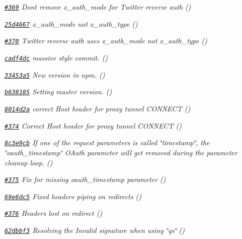 \begin{DoxyItemize}
\item {\itshape \href{https://github.com/mikeal/request/pull/369}{\tt \#369} Don\textquotesingle{}t remove x\+\_\+auth\+\_\+mode for Twitter reverse auth ()}
\item {\itshape \href{https://github.com/mikeal/request/commit/25d466773c43949e2eea4236ffc62841757fd1f0}{\tt 25d4667} x\+\_\+auth\+\_\+mode not x\+\_\+auth\+\_\+type ()}
\item {\itshape \href{https://github.com/mikeal/request/pull/370}{\tt \#370} Twitter reverse auth uses x\+\_\+auth\+\_\+mode not x\+\_\+auth\+\_\+type ()}
\item {\itshape \href{https://github.com/mikeal/request/commit/cadf4dc54f4ee3fae821f6beb1ea6443e528bf6f}{\tt cadf4dc} massive style commit. ()}
\item {\itshape \href{https://github.com/mikeal/request/commit/33453a53bc37e4499853b9d929b3603cdf7a31cd}{\tt 33453a5} New version in npm. ()}
\item {\itshape \href{https://github.com/mikeal/request/commit/b6381854006470af1d0607f636992c7247b6720f}{\tt b638185} Setting master version. ()}
\item {\itshape \href{https://github.com/mikeal/request/commit/8014d2a5b797f07cf56d2f39a346031436e1b064}{\tt 8014d2a} correct Host header for proxy tunnel C\+O\+N\+N\+E\+C\+T ()}
\item {\itshape \href{https://github.com/mikeal/request/pull/374}{\tt \#374} Correct Host header for proxy tunnel C\+O\+N\+N\+E\+C\+T ()}
\item {\itshape \href{https://github.com/mikeal/request/commit/8c3e9cb529767cff5e7206e2e76531183085b42a}{\tt 8c3e9cb} If one of the request parameters is called \char`\"{}timestamp\char`\"{}, the \char`\"{}oauth\+\_\+timestamp\char`\"{} O\+Auth parameter will get removed during the parameter cleanup loop. ()}
\item {\itshape \href{https://github.com/mikeal/request/pull/375}{\tt \#375} Fix for missing oauth\+\_\+timestamp parameter ()}
\item {\itshape \href{https://github.com/mikeal/request/commit/69e6dc5c80e67bbd7d135c3ceb657a1b2df58763}{\tt 69e6dc5} Fixed headers piping on redirects ()}
\item {\itshape \href{https://github.com/mikeal/request/pull/376}{\tt \#376} Headers lost on redirect ()}
\item {\itshape \href{https://github.com/mikeal/request/commit/62dbbf3d77b0851ba424d4f09d1d0c0be91c1f2d}{\tt 62dbbf3} Resolving the Invalid signature when using \char`\"{}qs\char`\"{} ()}

\end{DoxyItemize}
